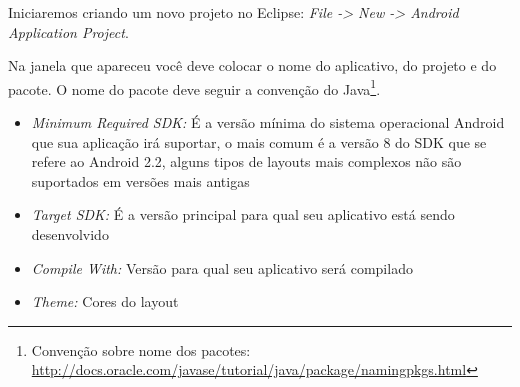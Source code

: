 \documentclass[a4paper,12pt,brazil,doubleside]{book}
\begin{document}
Iniciaremos criando um novo projeto no Eclipse: \textit{File -> New -> Android Application Project}.

Na janela que apareceu você deve colocar o nome do aplicativo, do projeto e do pacote. O nome do pacote deve seguir a convenção do Java\footnote{Convenção sobre nome dos pacotes: \href{http://docs.oracle.com/javase/tutorial/java/package/namingpkgs.html}{http://docs.oracle.com/javase/tutorial/java/package/namingpkgs.html}}.
\begin{itemize}
	\item \textit{Minimum Required SDK:} É a versão mínima do sistema operacional Android que sua aplicação irá suportar, o mais comum é a versão 8 do SDK que se refere ao Android 2.2, alguns tipos de layouts mais complexos não são suportados em versões mais antigas
	\item \textit{Target SDK:} É a versão principal para qual seu aplicativo está sendo desenvolvido
	\item \textit{Compile With:} Versão para qual seu aplicativo será compilado
	\item \textit{Theme:} Cores do layout
\end{itemize}
\end{document}
